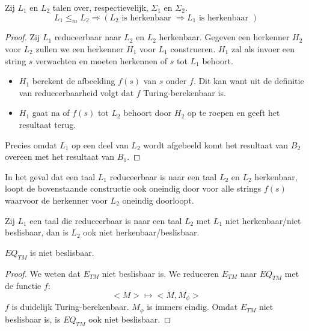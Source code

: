 \documentclass[main.tex]{subfiles}
\begin{document}
\begin{st}
  Zij $L_1$ en $L_2$ talen over, respectievelijk, $\Sigma_1$ en $\Sigma_2$.
  \[ L_1\le_m L_2 \Rightarrow (L_2 \text{ is herkenbaar } \Rightarrow L_1 \text{ is herkenbaar }) \]

  \begin{proof}
    Zij $L_{1}$ reduceerbaar naar $L_{2}$ en $L_{2}$ herkenbaar.
    Gegeven een herkenner $H_{2}$ voor $L_{2}$ zullen we een herkenner $H_{1}$ voor $L_{1}$ construeren.
    $H_{1}$ zal als invoer een string $s$ verwachten en moeten herkennen of $s$ tot $L_{1}$ behoort.
    \begin{itemize}
    \item $H_{1}$ berekent de afbeelding $f(s)$ van $s$ onder $f$.
      Dit kan want uit de definitie van reduceerbaarheid volgt dat $f$ Turing-berekenbaar is.
    \item $H_{1}$ gaat na of $f(s)$ tot $L_{2}$ behoort door $H_{2}$ op te roepen en geeft het resultaat terug.
    \end{itemize}
    Precies omdat $L_{1}$ op een deel van $L_{2}$ wordt afgebeeld komt het resultaat van $B_{2}$ overeen met het resultaat van $B_{1}$.
  \end{proof}
\end{st}

\begin{opm}
  In het geval dat een taal $L_{1}$ reduceerbaar is naar een taal $L_{2}$ en $L_{2}$ herkenbaar, loopt de bovenstaande constructie ook oneindig door voor alle strings $f(s)$ waarvoor de herkenner voor $L_{2}$ oneindig doorloopt.
\end{opm}

\begin{gev}
  \label{gev:reductie-niet-beslisbaarheid}
  Zij $L_{1}$ een taal die reduceerbaar is naar een taal $L_{2}$ met $L_{1}$ niet herkenbaar/niet beslisbaar, dan is $L_{2}$ ook niet herkenbaar/beslisbaar.
  \zb
\end{gev}

\begin{st}
  \label{st:eq-tm-niet-besl}
  $EQ_{TM}$ is niet beslisbaar.

  \begin{proof}
    We weten dat $E_{TM}$ niet beslisbaar is.
    We reduceren $E_{TM}$ naar $EQ_{TM}$ met de functie $f$:
    \[
    <M> \mapsto <M,M_{\phi}>
    \]
    $f$ is duidelijk Turing-berekenbaar. $M_{\phi}$ is immers eindig.
    Omdat $E_{TM}$ niet beslisbaar is, is $EQ_{TM}$ ook niet beslisbaar.
  \end{proof}
\end{st}
\end{document}

